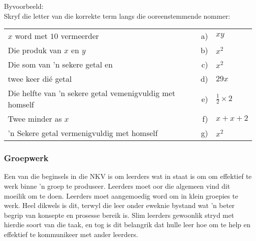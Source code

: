 Byvoorbeeld: \\
Skryf die letter van die korrekte term langs die ooreenstemmende nommer:
\begin{table}[H]
 \begin{center}
  \begin{tabular}{lrl} 
$x$ word met $10$ vermeerder&					a)	&$xy$ \\
Die produk van $x$ en $y$		 &		 b)	&$x^2$\\
Die som van 'n sekere getal en	&		c)&	$x^2$\\
twee keer di\'{e} getal&					d)&	$29x$	\\
Die helfte van 'n sekere getal vemenigvuldig met homself	&	e)&	$\frac{1}{2} \times 2$\\
Twee minder as $x$&					f)&	$x + x + 2  $\\
'n Sekere getal vermenigvuldig met homself	&		g)&	$x^ 2$\\
  \end{tabular}
 \end{center}
\end{table}

\subsubsection{Groepwerk}
Een van die beginsels in die NKV is om leerders wat in staat is om om
effektief te werk binne 'n groep te produseer. Leerders moet oor die
algemeen vind dit moeilik om te doen. Leerders moet aangemoedig word
om in klein groepies te werk. Heel dikwels is dit, terwyl die leer
onder eweknie bystand wat 'n beter begrip van konsepte en prosesse
bereik is. Slim leerders gewoonlik stryd met hierdie soort van die
taak, en tog is dit belangrik dat hulle leer hoe om te help en
effektief te kommunikeer met ander leerders.

